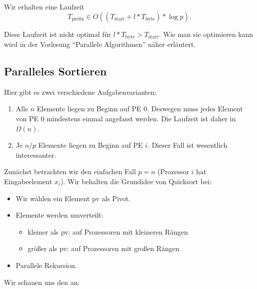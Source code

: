 Wir erhalten eine Laufzeit
\begin{equation*}
  T_\text{prefix} \in O((T_\text{start} + l * T_\text{byte}) * \log p)\text{.}
\end{equation*}

Diese Laufzeit ist nicht optimal für $l * T_\text{byte} > T_\text{start}$. Wie man sie optimieren kann wird in der Vorlesung ``Parallele Algorithmen'' näher erläutert.

\subsection{Paralleles Sortieren}

Hier gibt es zwei verschiedene Aufgabenvarianten:

\begin{enumerate}
  \item Alle \( n \) Elemente liegen zu Beginn auf PE 0. Deswegen muss jedes Element von PE 0 mindestens einmal angefasst werden. Die Laufzeit ist daher in \( \Omega(n) \).
  \item Je \( n/p \) Elemente liegen zu Beginn auf PE \( i \). Dieser Fall ist wesentlich interessanter.
\end{enumerate}

Zunächst betrachten wir den einfachen Fall \( p = n \) (Prozessor \( i \) hat Eingabeelement \( x_i \)). Wir behalten die Grundidee von Quicksort bei:
\begin{itemize}
  \item Wir wählen ein Element pv als Pivot.
  \item Elemente werden umverteilt:
  \begin{itemize}
    \item kleiner als pv: auf Prozessoren mit kleineren Rängen
    \item größer als pv: auf Prozessoren mit großen Rängen
  \end{itemize}
  \item Parallele Rekursion.
\end{itemize}

Wir schauen uns den  an:

